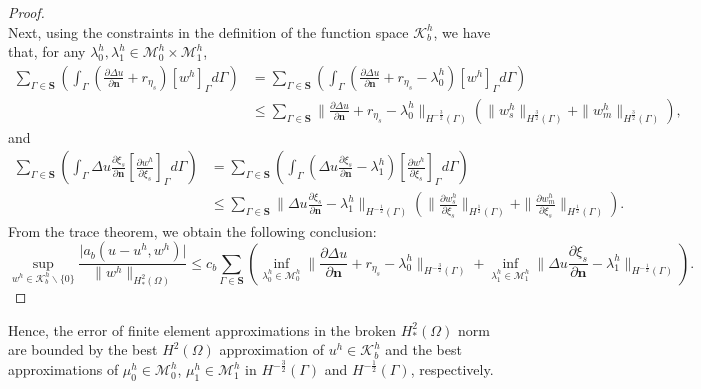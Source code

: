 \begin{theorem}
\begin{proof}
\begin{equation}
    \end{equation}
    Next, using the constraints in the definition of the function space $\mathcal{K}^h_b$, we have that, for any $\lambda_0^h, \lambda_1^h \in \mathcal{M}_0^h\times\mathcal{M}_1^h$,
    \begin{equation}
      \begin{split}
        \sum_{\Gamma\in \mathbf{S}}\left(\int_\Gamma\left(\frac{\partial \Delta u}{\partial \mathbf{n}} + r_{\eta_s}  \right)\left[{w^h}\right]_\Gamma d\Gamma\right) &= \sum_{\Gamma\in \mathbf{S}}\left(\int_\Gamma\left(\frac{\partial \Delta u}{\partial \mathbf{n}} + r_{\eta_s} - \lambda_0^h \right)\left[{w^h}\right]_\Gamma d\Gamma\right)\\
        &\leq \sum_{\Gamma\in \mathbf{S}} \| \frac{\partial \Delta u}{\partial \mathbf{n}} + r_{\eta_s} - \lambda_0^h \|_{H^{-\frac{3}{2}}(\Gamma)}\left(\|w^h_s\|_{H^{\frac{3}{2}}(\Gamma)}+\|w^h_m\|_{H^{\frac{3}{2}}(\Gamma)}\right),
      \end{split}
    \end{equation}
    and
    \begin{equation}
      \begin{split}
        \sum_{\Gamma\in \mathbf{S}}\left(\int_\Gamma\Delta u \frac{\partial \xi_s}{\partial \mathbf{n}}\left[\frac{\partial{w^h}}{\partial \xi_s}\right]_\Gamma d\Gamma\right) &= \sum_{\Gamma\in \mathbf{S}}\left(\int_\Gamma\left(\Delta u \frac{\partial \xi_s}{\partial \mathbf{n}} - \lambda_1^h \right)\left[\frac{\partial{w^h}}{\partial \xi_s}\right]_\Gamma d\Gamma\right)\\
        &\leq \sum_{\Gamma\in \mathbf{S}} \| \Delta u \frac{\partial \xi_s}{\partial \mathbf{n}} - \lambda_1^h \|_{H^{-\frac{1}{2}}(\Gamma)}\left(\|\frac{\partial w^h_s}{\partial \xi_s}\|_{H^{\frac{1}{2}}(\Gamma)}+\|\frac{\partial w^h_m}{\partial \xi_s}\|_{H^{\frac{1}{2}}(\Gamma)}\right).
      \end{split}
    \end{equation}
    From the trace theorem, we obtain the following conclusion:
    \begin{equation}
      \sup_{w^h\in \mathcal{K}_b^h\backslash \{0\}}\frac{\vert a_b(u-u^h,w^h) \vert }{\|w^h\|_{H^2_*(\Omega)}}\leq c_b\sum_{\Gamma\in \mathbf{S}}\left( \inf_{\lambda_0^h\in \mathcal{M}_0^h}\| \frac{\partial \Delta u}{\partial \mathbf{n}} + r_{\eta_s} - \lambda_0^h \|_{H^{-\frac{3}{2}}(\Gamma)}+ \inf_{\lambda_1^h\in \mathcal{M}_1^h} \| \Delta u \frac{\partial \xi_s}{\partial \mathbf{n}} - \lambda_1^h \|_{H^{-\frac{1}{2}}(\Gamma)}\right).\label{eq:consistency_error}
    \end{equation}
  \end{proof}
\end{theorem}
Hence, the error of finite element approximations in the broken $H^2_*(\Omega)$ norm are bounded by the best $H^2(\Omega)$ approximation of $u^h\in\mathcal{K}_b^h$ and the best approximations of $\mu_0^h\in{\mathcal{M}_0^h}$, $\mu_1^h\in{\mathcal{M}_1^h}$ in $H^{-\frac{3}{2}}(\Gamma)$ and $H^{-\frac{1}{2}}(\Gamma)$, respectively.

